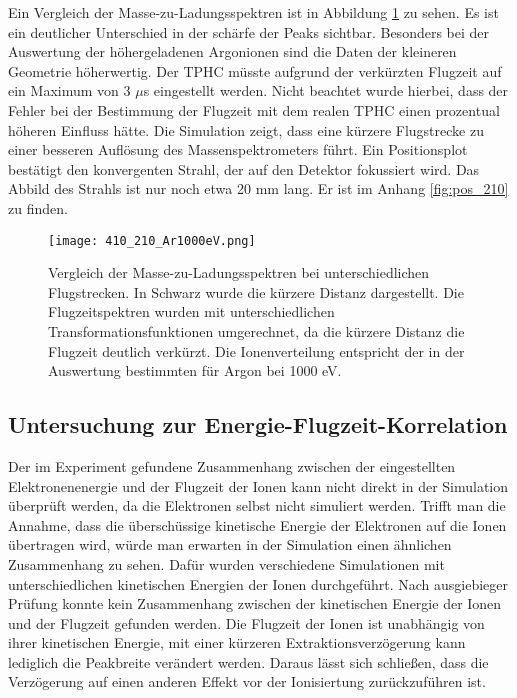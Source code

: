 Ein Vergleich der Masse-zu-Ladungsspektren ist in Abbildung \ref{fig:410_210} zu sehen. Es ist ein deutlicher Unterschied in der schärfe der Peaks sichtbar. Besonders bei der Auswertung der höhergeladenen Argonionen sind die Daten der kleineren Geometrie höherwertig. Der TPHC müsste aufgrund der verkürzten Flugzeit auf ein Maximum von 3 $\mu$s eingestellt werden. Nicht beachtet wurde hierbei, dass der Fehler bei der Bestimmung der Flugzeit mit dem realen TPHC einen prozentual höheren Einfluss hätte. Die Simulation zeigt, dass eine kürzere Flugstrecke zu einer besseren Auflösung des Massenspektrometers führt. Ein Positionsplot bestätigt den konvergenten Strahl, der auf den Detektor fokussiert wird. Das Abbild des Strahls ist nur noch etwa 20 mm lang. Er ist im Anhang \ref{fig:pos_210} zu finden.

\begin{figure}
    \centering
    \texttt{[image: 410\_210\_Ar1000eV.png]}
    \caption[Vergleich der Masse-zu-Ladungsspektren bei unterschiedlichen Flugstrecken]{Vergleich der Masse-zu-Ladungsspektren bei unterschiedlichen Flugstrecken. In Schwarz wurde die kürzere Distanz dargestellt. Die Flugzeitspektren wurden mit unterschiedlichen Transformationsfunktionen umgerechnet, da die kürzere Distanz die Flugzeit deutlich verkürzt. Die Ionenverteilung entspricht der in der Auswertung bestimmten für Argon bei 1000 eV.}
    \label{fig:410_210}
\end{figure}
\subsection{Untersuchung zur Energie-Flugzeit-Korrelation}
Der im Experiment gefundene Zusammenhang zwischen der eingestellten Elektronenenergie und der Flugzeit der Ionen kann nicht direkt in der Simulation überprüft werden, da die Elektronen selbst nicht simuliert werden. Trifft man die Annahme, dass die überschüssige kinetische Energie der Elektronen auf die Ionen übertragen wird, würde man erwarten in der Simulation einen ähnlichen Zusammenhang zu sehen. Dafür wurden verschiedene Simulationen mit unterschiedlichen kinetischen Energien der Ionen durchgeführt. Nach ausgiebieger Prüfung konnte kein Zusammenhang zwischen der kinetischen Energie der Ionen und der Flugzeit gefunden werden. Die Flugzeit der Ionen ist unabhängig von ihrer kinetischen Energie, mit einer kürzeren Extraktionsverzögerung kann lediglich die Peakbreite verändert werden. Daraus lässt sich schließen, dass die Verzögerung auf einen anderen Effekt vor der Ionisiertung zurückzuführen ist. 

